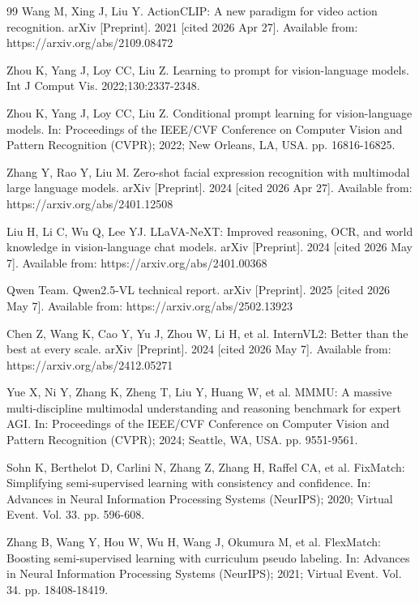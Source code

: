 \documentclass{ieeeaccess}
\begin{document}
\begin{thebibliography}{99}
Wang M, Xing J, Liu Y.
ActionCLIP: A new paradigm for video action recognition.
arXiv [Preprint]. 2021 [cited 2026 Apr 27]. Available from:
https://arxiv.org/abs/2109.08472

Zhou K, Yang J, Loy CC, Liu Z.
Learning to prompt for vision-language models.
Int J Comput Vis. 2022;130:2337-2348.

Zhou K, Yang J, Loy CC, Liu Z.
Conditional prompt learning for vision-language models.
In: Proceedings of the IEEE/CVF Conference on Computer Vision and
Pattern Recognition (CVPR); 2022; New Orleans, LA, USA.
pp. 16816-16825.

Zhang Y, Rao Y, Liu M.
Zero-shot facial expression recognition with multimodal large language
models. arXiv [Preprint]. 2024 [cited 2026 Apr 27]. Available from:
https://arxiv.org/abs/2401.12508

Liu H, Li C, Wu Q, Lee YJ.
LLaVA-NeXT: Improved reasoning, OCR, and world knowledge in
vision-language chat models. arXiv [Preprint]. 2024 [cited 2026 May 7].
Available from: https://arxiv.org/abs/2401.00368

Qwen Team.
Qwen2.5-VL technical report. arXiv [Preprint]. 2025 [cited 2026 May 7].
Available from: https://arxiv.org/abs/2502.13923

Chen Z, Wang K, Cao Y, Yu J, Zhou W, Li H, et al.
InternVL2: Better than the best at every scale.
arXiv [Preprint]. 2024 [cited 2026 May 7]. Available from:
https://arxiv.org/abs/2412.05271

Yue X, Ni Y, Zhang K, Zheng T, Liu Y, Huang W, et al.
MMMU: A massive multi-discipline multimodal understanding and
reasoning benchmark for expert AGI. In: Proceedings of the IEEE/CVF
Conference on Computer Vision and Pattern Recognition (CVPR); 2024;
Seattle, WA, USA. pp. 9551-9561.

Sohn K, Berthelot D, Carlini N, Zhang Z, Zhang H, Raffel CA, et al.
FixMatch: Simplifying semi-supervised learning with consistency
and confidence.
In: Advances in Neural Information Processing Systems (NeurIPS);
2020; Virtual Event. Vol. 33. pp. 596-608.

Zhang B, Wang Y, Hou W, Wu H, Wang J, Okumura M, et al.
FlexMatch: Boosting semi-supervised learning with curriculum pseudo
labeling.
In: Advances in Neural Information Processing Systems (NeurIPS);
2021; Virtual Event. Vol. 34. pp. 18408-18419.


\end{thebibliography}
\end{document}
